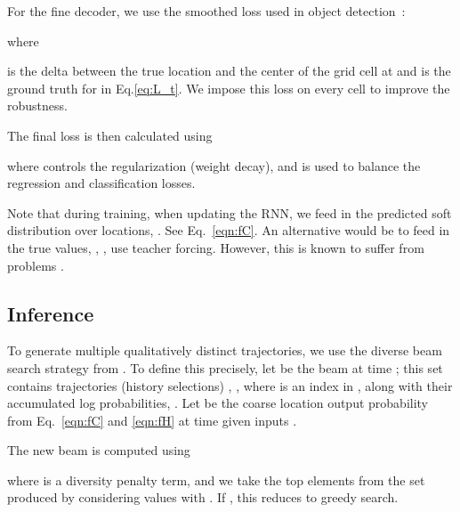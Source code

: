 \documentclass[10pt,twocolumn,letterpaper]{article}
\newcommand{\eat}[1]{}
\begin{document}
For the fine decoder, we use the smoothed  loss
used in object detection~\cite{ren2015faster}:

where 
 
is the delta between the true location and the center of the grid cell at  and  is the ground truth for  in Eq.\eqref{eq:L_t}. We impose this loss on every cell to improve the robustness.



The final loss is then calculated using

where  controls the  regularization (weight decay),
and  is used
to balance the regression and classification losses.

Note that during training, when updating the 
RNN, we feed in the predicted
soft distribution
over locations, . See Eq.~\eqref{eqn:fC}.
An alternative would be to feed in the true
values, , \ie, use teacher forcing.
However, this is known to suffer
from problems \cite{Ranzato2016}.




\vspace{-1mm}
\subsection{Inference}\label{sec:inference}
\vspace{-1mm}
To generate multiple qualitatively distinct
 trajectories, we use the diverse beam search strategy from \cite{li2016simple}.
 To define this precisely,
 let  be the beam at time ;
 this set contains  trajectories (history
 selections) , , where  is an index in ,
 along with
 their accumulated log probabilities,
 .
 Let  be the coarse location output probability from Eq.~\eqref{eqn:fC} and \eqref{eqn:fH} at time  given inputs .
 
 The new beam is computed using


where  is a diversity penalty term,
and we take the top  elements from the set
produced by considering 
values with .
If , this reduces to greedy search.


 \eat{
 Here we use a single index  to represent grid cells.
 Let  represents the probability of selecting cell .
Define

as the probability of the new beams at time ,
where  is a diversity penalty term.
We select the grid cells at time  based on the probabilities and get  for the new beam selections.
If , this reduces to greedy search.
}
\end{document}
